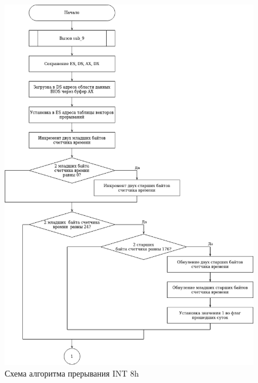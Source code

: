 \begin{figure}[h!]
	\begin{center}
		\includegraphics[scale=0.6]{assets/int8F.drawio.png}
		\caption{Схема алгоритма прерывания INT 8h}
	\end{center}
\end{figure}

